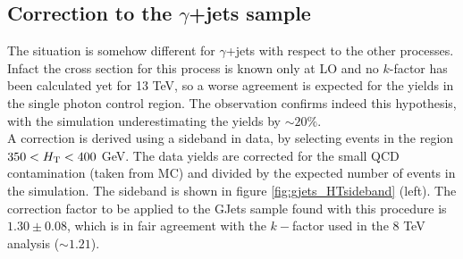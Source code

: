 \subsection{Correction to the $\gamma$+jets sample}
\label{sec:sideband_corrections_gjets}
The situation is somehow different for $\gamma$+jets with respect to the other processes. 
Infact the cross section for this process is known only at LO and no $k$-factor has been calculated yet for 13 TeV, 
so a worse agreement is expected for the yields in the single photon control region.
The observation confirms indeed this hypothesis, with the simulation underestimating the yields by $\sim 20\%$. \\
A correction is derived using a sideband in data, by selecting events in the region $350 < \scalht < 400$ GeV. 
The data yields are corrected for the small QCD contamination (taken from MC) and divided by the expected number of events in the simulation. 
The sideband is shown in figure \ref{fig:gjets_HTsideband} (left).
The correction factor to be applied to the GJets sample found with this procedure is $1.30 \pm 0.08$, 
which is in fair agreement with the $k-$factor used in the 8 TeV analysis ($\sim 1.21$). 

